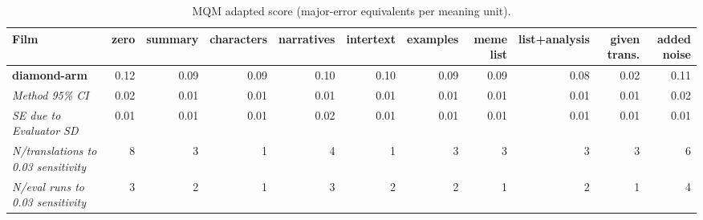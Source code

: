 \begin{table}[ht]
\centering
\begin{adjustbox}{width=\textwidth}
\begin{tabular}{lrrrrrrrrr|r}
Film & zero & summary & characters & narratives & intertext & examples & meme list & list+analysis & given trans. & added noise \\
\hline
\textbf{diamond-arm} & 0.12 & 0.09 & 0.09 & 0.10 & 0.10 & 0.09 & 0.09 & 0.08 & 0.02 & 0.11 \\

\emph{Method 95\% CI} & 0.02 & 0.01 & 0.01 & 0.01 & 0.01 & 0.01 & 0.01 & 0.01 & 0.01 & 0.02 \\

\emph{SE due to Evaluator SD} & 0.01 & 0.01 & 0.01 & 0.02 & 0.01 & 0.01 & 0.01 & 0.01 & 0.01 & 0.01 \\

\emph{N/translations to 0.03 sensitivity} & 8 & 3 & 1 & 4 & 1 & 3 & 3 & 3 & 3 & 6 \\

\emph{N/eval runs to 0.03 sensitivity} & 3 & 2 & 1 & 3 & 2 & 2 & 1 & 2 & 1 & 4 \\

\hline
\end{tabular}
\end{adjustbox}
\caption{MQM adapted score (major-error equivalents per meaning unit).}
\label{tab:mqm-method-comparison}
\end{table}
